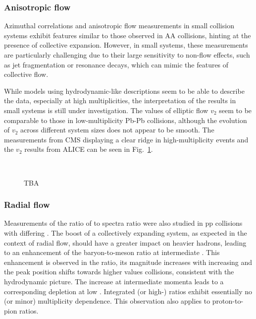 \subsubsection{Anisotropic flow}

Azimuthal correlations and anisotropic flow measurements in small collision systems exhibit features similar to those observed in AA collisions, hinting at the presence of collective expansion. However, in small systems, these measurements are particularly challenging due to their large sensitivity to non-flow effects, such as jet fragmentation or resonance decays, which can mimic the features of collective flow. 

While models using hydrodynamic-like descriptions seem to be able to describe the data, especially at high multiplicities, the interpretation of the results in small systems is still under investigation. The values of elliptic flow $v_2$ seem to be comparable to those in low-multiplicity Pb-Pb collisions, although the evolution of $v_2$ across different system sizes does not appear to be smooth. The measurements from CMS displaying a clear ridge in high-multiplicity events and the $v_2$ results from ALICE can be seen in Fig.~\ref{fig:colls:ssv2}.

\begin{figure}[H]
\\
\caption{TBA}
\label{fig:colls:ssv2}
\end{figure}

\subsubsection{Radial flow}

Measurements of the ratio of \LA to \KOs \pt spectra ratio were also studied in pp collisions with differing \Nch. The boost of a collectively expanding system, as expected in the context of radial flow, should have a greater impact on heavier hadrons, leading to an enhancement of the baryon-to-meson ratio at intermediate \pt. This enhancement is observed in the \ltok ratio, its magnitude increases with increasing \Nch and the peak position shifts towards higher values collisions, consistent with the hydrodynamic picture. The increase at intermediate momenta leads to a corresponding depletion at low \pt. Integrated (or high-\pt) \ltok ratios exhibit essentially no (or minor) multiplicity dependence. This observation also applies to proton-to-pion ratios. 

